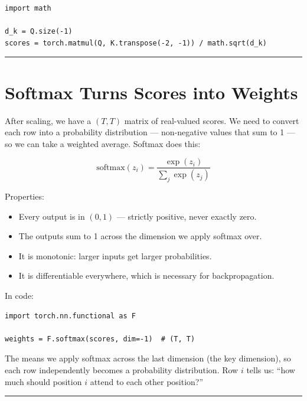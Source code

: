 \demotag
\begin{lstlisting}
import math

d_k = Q.size(-1)
scores = torch.matmul(Q, K.transpose(-2, -1)) / math.sqrt(d_k)
\end{lstlisting}

\bigskip\hrule\bigskip

\section{Softmax Turns Scores into Weights}

After scaling, we have a $(T, T)$ matrix of real-valued scores. We need to convert each row into a probability distribution --- non-negative values that sum to 1 --- so we can take a weighted average. Softmax does this:

\[
\mathrm{softmax}(z_i) = \frac{\exp(z_i)}{\sum_j \exp(z_j)}
\]

Properties:
\begin{itemize}
  \item Every output is in $(0, 1)$ --- strictly positive, never exactly zero.
  \item The outputs sum to 1 across the dimension we apply softmax over.
  \item It is monotonic: larger inputs get larger probabilities.
  \item It is differentiable everywhere, which is necessary for backpropagation.
\end{itemize}

In code:

\demotag
\begin{lstlisting}
import torch.nn.functional as F

weights = F.softmax(scores, dim=-1)  # (T, T)
\end{lstlisting}

The  means we apply softmax across the last dimension (the key dimension), so each row independently becomes a probability distribution. Row $i$ tells us: ``how much should position $i$ attend to each other position?''


\bigskip\hrule\bigskip

